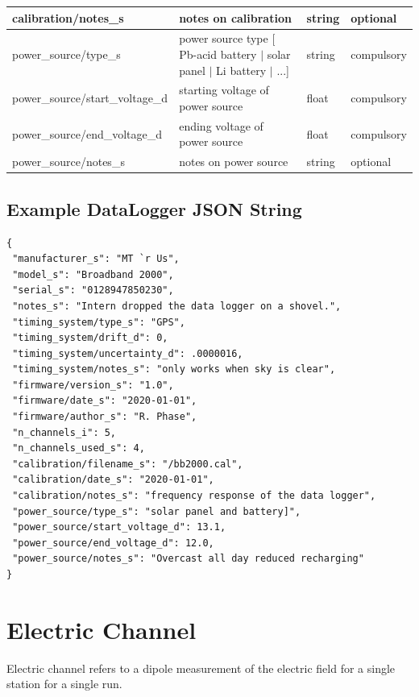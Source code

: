 \documentclass{article}
\begin{document}
\begin{table}[htb!]
\begin{tabular}{|l|p{3in}|l|l|}
		calibration/notes\_s & notes on calibration & string & optional \\ \hline
		power\_source/type\_s & power source type [ Pb-acid battery $|$ solar panel $|$ Li battery $|$ ...] & string & compulsory \\ \hline
		power\_source/start\_voltage\_d & starting voltage of power source & float & compulsory \\ \hline
		power\_source/end\_voltage\_d & ending voltage of power source & float & compulsory \\ \hline
		power\_source/notes\_s & notes on power source & string & optional \\ \hline
	\end{tabular}
	\label{tab:datalogger}
\end{table}	

\newpage
\subsection{Example DataLogger JSON String}

\begin{verbatim}
{
 "manufacturer_s": "MT `r Us",
 "model_s": "Broadband 2000",
 "serial_s": "0128947850230",
 "notes_s": "Intern dropped the data logger on a shovel.",
 "timing_system/type_s": "GPS",
 "timing_system/drift_d": 0,
 "timing_system/uncertainty_d": .0000016,
 "timing_system/notes_s": "only works when sky is clear",
 "firmware/version_s": "1.0",
 "firmware/date_s": "2020-01-01",
 "firmware/author_s": "R. Phase",
 "n_channels_i": 5,
 "n_channels_used_s": 4,
 "calibration/filename_s": "/bb2000.cal",
 "calibration/date_s": "2020-01-01",
 "calibration/notes_s": "frequency response of the data logger",
 "power_source/type_s": "solar panel and battery]",
 "power_source/start_voltage_d": 13.1,
 "power_source/end_voltage_d": 12.0,
 "power_source/notes_s": "Overcast all day reduced recharging"
}
\end{verbatim}

\newpage
\section{Electric Channel}

Electric channel refers to a dipole measurement of the electric field for a single station for a single run.
 
\end{document}
